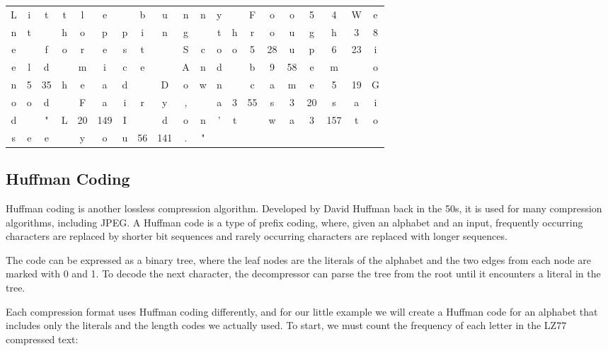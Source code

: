 \documentclass[12pt]{article}
\begin{document}
\begin{table}[H]
\ttfamily
\begin{tabular}{cccccccccccccccccccc}
  L & i & t & t & l & e &  & b & u & n & n & y &  & F & o & o & \color{blue} 5 & \color{red} 4 & W & e \\
  n & t &  & h & o & p & p & i & n & g &  & t & h & r & o & u & g & h & \color{blue} 3 & \color{red} 8 \\
  e &  & f & o & r & e & s & t &  & S & c & o & o & \color{blue} 5 & \color{red} 28 & u & p & \color{blue} 6 & \color{red} 23 & i \\
  e & l & d &  & m & i & c & e &  & A & n & d &  & b & \color{blue} 9 & \color{red} 58 & e & m &  & o \\
  n & \color{blue} 5 & \color{red} 35 & h & e & a & d &  & D & o & w & n &  & c & a & m & e & \color{blue} 5 & \color{red} 19 & G \\
  o & o & d &  & F & a & i & r & y & , &  & a & \color{blue} 3 & \color{red} 55 & s & \color{blue} 3 & \color{red} 20 & s & a & i \\
  d &  & " & L & \color{blue} 20 & \color{red} 149 & I &  & d & o & n & ' & t &  & w & a & \color{blue} 3 & \color{red} 157 & t & o \\
  s & e & e &  & y & o & u & \color{blue} 56 & \color{red} 141 & . & " &  &  &  &  &  &  &  &  &
\end{tabular}
\end{table}

\subsection{Huffman Coding}

Huffman coding is another lossless compression algorithm. Developed by
David Huffman back in the 50s, it is used for many compression
algorithms, including JPEG. A Huffman code is a type of prefix coding,
where, given an alphabet and an input, frequently occurring characters
are replaced by shorter bit sequences and rarely occurring characters
are replaced with longer sequences.

The code can be expressed as a binary tree, where the leaf nodes are the
literals of the alphabet and the two edges from each node are marked
with 0 and 1. To decode the next character, the decompressor can parse
the tree from the root until it encounters a literal in the tree.

Each compression format uses Huffman coding differently, and for our
little example we will create a Huffman code for an alphabet that
includes only the literals and the length codes we actually used. To
start, we must count the frequency of each letter in the LZ77 compressed
text:
\end{document}
